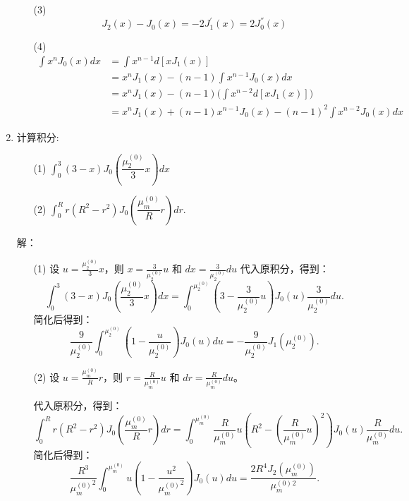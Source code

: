 \documentclass[11pt]{article}
\begin{document}
\begin{enumerate}
\begin{enumerate}
        \item[(3)]\[J_{2}(x)-J_{0}(x)=-2J_{1}^{'}(x)=2J_{0}^{''}(x)\]
        \item[(4)]\[\begin{aligned}
                        \displaystyle\int x^{n}J_{0}(x)dx&=\displaystyle\int x^{n-1}d[xJ_{1}(x)]\\
                                                        &=x^{n}J_{1}(x)-(n-1)\displaystyle\int x^{n-1}J_{0}(x)dx\\
                                                        &=x^{n}J_{1}(x)-(n-1)\big(\displaystyle\int x^{n-2}d[xJ_{1}(x)]\big)\\
                                                        &=x^{n}J_{1}(x)+(n-1)x^{n-1}J_0(x)-(n-1)^2 \displaystyle\int x^{n-2}J_0(x)dx
                   \end{aligned}\]
    \end{enumerate}

    \item 计算积分:
    \begin{enumerate}
        \item[(1)] $\displaystyle\int_{0}^{3}(3-x)J_0(\dfrac{\mu_{2}^{(0)}}{3}x)dx$
        \item[(2)] $\displaystyle\int_{0}^{R}r(R^2 -r^2)J_{0}(\dfrac{\mu_{m}^{(0)}}{R}r)dr$.
    \end{enumerate}
    解：
    \begin{enumerate}
        \item[(1)]  设 $ u = \frac{\mu_{2}^{(0)}}{3} x $，则 $ x = \frac{3}{\mu_{2}^{(0)}} u $ 和 $ dx = \frac{3}{\mu_{2}^{(0)}} du $
                    代入原积分，得到：
                    \[
                    \int_0^3 (3 - x) J_0\left(\frac{\mu_{2}^{(0)}}{3} x\right) dx = \int_0^{\mu_{2}^{(0)}} \left(3 - \frac{3}{\mu_{2}^{(0)}} u\right) J_0(u) \frac{3}{\mu_{2}^{(0)}} du.
                    \]
                    简化后得到：
                    \[
                    \frac{9}{\mu_{2}^{(0)}} \int_0^{\mu_{2}^{(0)}} \left(1 - \frac{u}{\mu_{2}^{(0)}}\right) J_0(u) du=-\frac{9}{\mu_{2}^{(0)}}J_{1}(\mu_{2}^{(0)}).
                    \]

        \item[(2)]
                    设 \( u = \frac{\mu_{m}^{(0)}}{R} r \)，则 \( r = \frac{R}{\mu_{m}^{(0)}} u \) 和 \( dr = \frac{R}{\mu_{m}^{(0)}} du \)。

                    代入原积分，得到：
                    \[
                    \int_0^R r (R^2 - r^2) J_0\left(\frac{\mu_{m}^{(0)}}{R} r\right) dr = \int_0^{\mu_{m}^{(0)}} \frac{R}{\mu_{m}^{(0)}} u \left(R^2 - \left(\frac{R}{\mu_{m}^{(0)}} u\right)^2\right) J_0(u) \frac{R}{\mu_{m}^{(0)}} du.
                    \]
                    简化后得到：
                    \[
                    \frac{R^3}{{\mu_{m}^{(0)}}^2} \int_0^{\mu_{m}^{(0)}} u \left(1 - \frac{u^2}{{\mu_{m}^{(0)}}^2}\right) J_0(u) du=\frac{2R^4 J_2(\mu_{m}^{(0)})}{\mu_{m}^{(0)}^{2}}.
                    \]
    \end{enumerate}


\end{enumerate}
\end{document}
